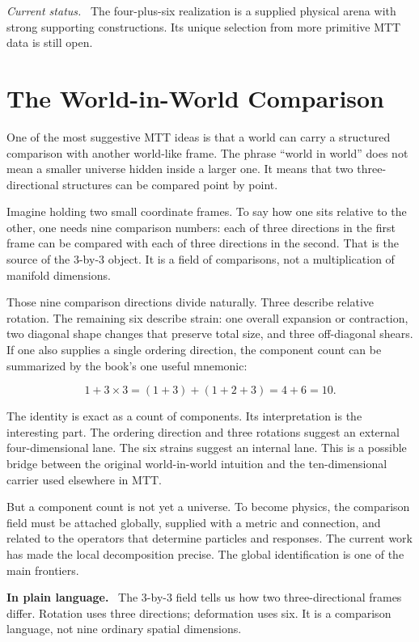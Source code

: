 \documentclass[11pt,openany]{book}
\newenvironment{plainsummary}
  {\par\small\noindent\textbf{In plain language.}\ }
  {\par}
\newenvironment{statusnote}
  {\par\small\noindent\textit{Current status.}\ }
  {\par}
\begin{document}
\begin{statusnote}
The four-plus-six realization is a supplied physical arena with strong
supporting constructions. Its unique selection from more primitive MTT data
is still open.
\end{statusnote}

\chapter{The World-in-World Comparison}

One of the most suggestive MTT ideas is that a world can carry a structured
comparison with another world-like frame. The phrase ``world in world'' does
not mean a smaller universe hidden inside a larger one. It means that two
three-directional structures can be compared point by point.

Imagine holding two small coordinate frames. To say how one sits relative to
the other, one needs nine comparison numbers: each of three directions in the
first frame can be compared with each of three directions in the second. That
is the source of the $3$-by-$3$ object. It is a field of comparisons, not a
multiplication of manifold dimensions.

Those nine comparison directions divide naturally. Three describe relative
rotation. The remaining six describe strain: one overall expansion or
contraction, two diagonal shape changes that preserve total size, and three
off-diagonal shears. If one also supplies a single ordering direction, the
component count can be summarized by the book's one useful mnemonic:

\[
 1+3\times3=(1+3)+(1+2+3)=4+6=10.
\]

The identity is exact as a count of components. Its interpretation is the
interesting part. The ordering direction and three rotations suggest an
external four-dimensional lane. The six strains suggest an internal lane.
This is a possible bridge between the original world-in-world intuition and
the ten-dimensional carrier used elsewhere in MTT.

But a component count is not yet a universe. To become physics, the
comparison field must be attached globally, supplied with a metric and
connection, and related to the operators that determine particles and
responses. The current work has made the local decomposition precise. The
global identification is one of the main frontiers.

\begin{plainsummary}
The $3$-by-$3$ field tells us how two three-directional frames differ. Rotation
uses three directions; deformation uses six. It is a comparison language,
not nine ordinary spatial dimensions.
\end{plainsummary}
\end{document}
